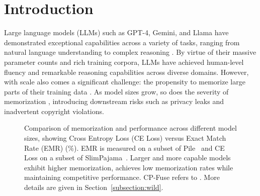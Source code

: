 \section{Introduction}
\label{section:introduction}

Large language models (LLMs) such as GPT-4, Gemini, and Llama have
demonstrated exceptional capabilities across a variety of tasks,
ranging from natural language understanding to complex reasoning
\citep{achiam2023gpt,team2023gemini,dubey2024llama}. By virtue of
their massive parameter counts and rich training corpora, LLMs
have achieved human-level fluency and remarkable reasoning
capabilities across diverse domains. However, with scale also comes a
significant challenge: the propensity to memorize large parts of their
training data \citep{carlini2021extracting}. As model sizes grow, so
does the severity of memorization \citep{carlini2022quantifying,
biderman2024emergent}, introducing downstream risks such as privacy leaks and inadvertent copyright violations.



\begin{figure}[h!]
\caption{
Comparison of memorization and performance across different model sizes, showing Cross Entropy Loss (CE Loss) versus Exact Match Rate (EMR) (\%). EMR is measured on a subset of Pile~\citep{chang2024localization} and CE Loss on a subset of SlimPajama~\citep{soboleva2023slimpajama}. Larger and more capable models exhibit higher memorization, \sys achieves low memorization rates while maintaining competitive performance. CP-Fuse refers to \citet{abad2024copyright}. More details are given in Section~\ref{subsection:wild}.}
\label{fig:memorizationvsperformance}
\end{figure}


